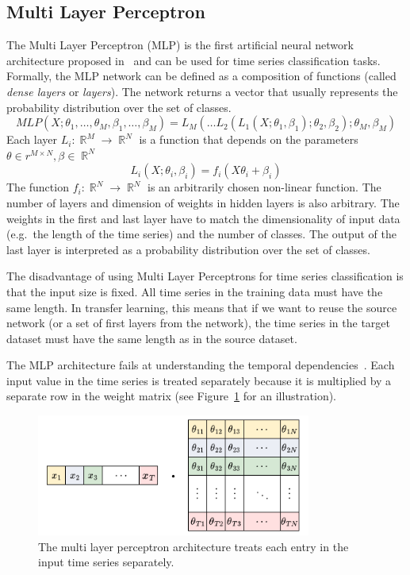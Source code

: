 \documentclass[a4paper,11pt,twoside]{report}
\theoremstyle{definition}
\DeclareMathOperator{\real}{\mathbb{R}}
\begin{document}
\subsection{Multi Layer Perceptron}\label{mlp_section_related}
The Multi Layer Perceptron (MLP) is the first artificial neural network architecture proposed in~\cite{dl_tsc} and can be used for time series classification tasks.
Formally, the MLP network can be defined as a composition of functions (called \textit{dense layers} or \textit{layers}). The network returns a vector that usually represents the probability distribution over the set of classes.
$$MLP(X; \theta_1,\dots , \theta_M, \beta_1,\dots , \beta_M) = L_M(\dots L_2(L_1(X;\theta_1, \beta_1);\theta_2, \beta_2);\theta_M, \beta_M)$$
Each layer $L_i: \real^M \rightarrow \real^N$ is a function that depends on the parameters $\theta \in r^{M\times N}, \beta \in \real^N$
$$L_i(X ; \theta_i, \beta_i) = f_i(X \theta_i  + \beta_i)$$
The function $f_i: \real^N \rightarrow \real^N$ is an arbitrarily chosen non-linear function. The number of layers and dimension of weights in hidden layers is also arbitrary. The weights in the first and last layer have to match the dimensionality of input data (e.g.~the length of the time series) and the number of classes. The output of the last layer is interpreted as a probability distribution over the set of classes.

The disadvantage of using Multi Layer Perceptrons for time series classification is that the input size is fixed. All time series in the training data must have the same length. In transfer learning, this means that if we want to reuse the source network (or a set of first layers from the network), the time series in the target dataset must have the same length as in the source dataset.

The MLP architecture fails at understanding the temporal dependencies~\cite{dl_tsc}. Each input value in the time series is treated separately because it is multiplied by a separate row in the weight matrix (see Figure~\ref{fig:mlp_multiplication} for an illustration).
\begin{figure}
\centering
\label{fig:mlp_multiplication}
\includegraphics[height=4cm]{imgs/MLP_multiplication_v2.png}
\caption{The multi layer perceptron architecture treats each entry in the input time series separately.}
\end{figure}
\end{document}
